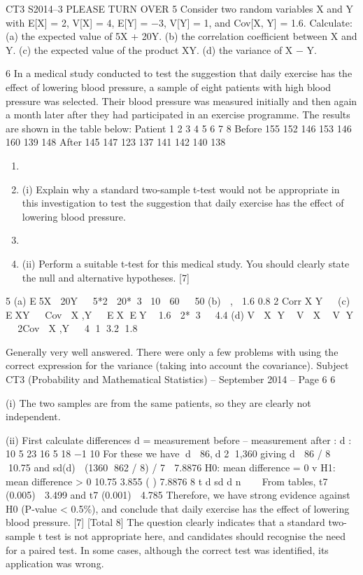 
CT3 S2014–3 PLEASE TURN OVER
5 Consider two random variables X and Y with E[X] = 2, V[X] = 4, E[Y] = −3, V[Y] = 1,
and Cov[X, Y] = 1.6.
Calculate:
(a) the expected value of 5X + 20Y.
(b) the correlation coefficient between X and Y.
(c) the expected value of the product XY.
(d) the variance of X − Y.

6 In a medical study conducted to test the suggestion that daily exercise has the effect of
lowering blood pressure, a sample of eight patients with high blood pressure was
selected. Their blood pressure was measured initially and then again a month later
after they had participated in an exercise programme. The results are shown in the
table below:
Patient 1 2 3 4 5 6 7 8
Before 155 152 146 153 146 160 139 148
After 145 147 123 137 141 142 140 138
\begin{enumerate}[\item (i)]
\item \item (i) Explain why a standard two-sample t-test would not be appropriate in this
investigation to test the suggestion that daily exercise has the effect of
lowering blood pressure. 
\item \item (ii) Perform a suitable t-test for this medical study. You should clearly state the
null and alternative hypotheses. [7]
\end{enumerate}

5 (a) E5X  20Y   5*2  20*3 10  60   50
(b)  ,  1.6 0.8
2
Corr X Y  
(c) EXY   Cov  X ,Y   EX EY  1.6  2*3  4.4
(d) V  X Y  V  X  V Y   2Cov  X ,Y   4 1 3.2 1.8

Generally very well answered. There were only a few problems with using the correct
expression for the variance (taking into account the covariance).
Subject CT3 (Probability and Mathematical Statistics) – September 2014 – %
Page 6
6 \item \item (i) The two samples are from the same patients, so they are clearly not
independent. 
\item \item (ii) First calculate differences d = measurement before – measurement after :
  d : 10 5 23 16 5 18 −1 10
For these we have d  86,d 2 1,360
giving d  86 / 8 10.75 and sd(d)  (1360 862 / 8) / 7  7.8876
H0: mean difference = 0 v H1: mean difference > 0
10.75 3.855
( ) 7.8876 8
t d
sd d n
  
From tables, t7 (0.005)  3.499 and t7 (0.001)  4.785
Therefore, we have strong evidence against H0 (P-value < 0.5\%), and
conclude that daily exercise has the effect of lowering blood pressure. [7]
[Total 8]
The question clearly indicates that a standard two-sample t
test is not appropriate here, and candidates should recognise the need for a paired test. In
some cases, although the correct test was identified, its application was wrong.

